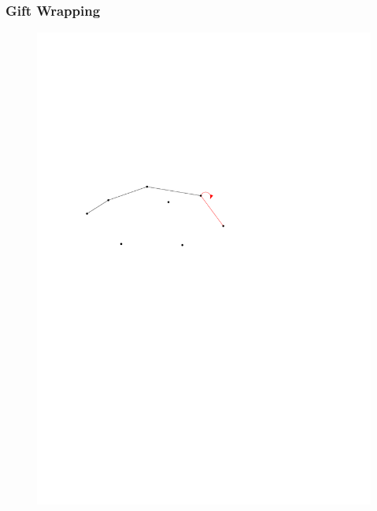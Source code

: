 \begin{frame}
	\frametitle{{Gift Wrapping}}
\begin{figure}[htbp]
	\begin{center}
  	\includegraphics[width=.8\linewidth]{bilder/giftwrap4}
	\end{center}
\end{figure}
\end{frame}

